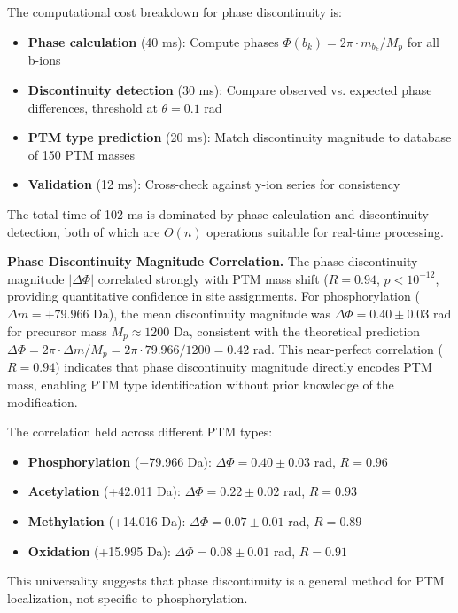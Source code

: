 \documentclass[11pt,twocolumn]{article}
\begin{document}
The computational cost breakdown for phase discontinuity is:
\begin{itemize}[leftmargin=*]
    \item \textbf{Phase calculation} (40 ms): Compute phases $\Phi(b_k) = 2\pi \cdot m_{b_k} / M_p$ for all b-ions
    \item \textbf{Discontinuity detection} (30 ms): Compare observed vs. expected phase differences, threshold at $\theta = 0.1$ rad
    \item \textbf{PTM type prediction} (20 ms): Match discontinuity magnitude to database of 150 PTM masses
    \item \textbf{Validation} (12 ms): Cross-check against y-ion series for consistency
\end{itemize}
The total time of 102 ms is dominated by phase calculation and discontinuity detection, both of which are $O(n)$ operations suitable for real-time processing.

\textbf{Phase Discontinuity Magnitude Correlation.} The phase discontinuity magnitude $|\Delta\Phi|$ correlated strongly with PTM mass shift ($R = 0.94$, $p < 10^{-12}$,  providing quantitative confidence in site assignments. For phosphorylation ($\Delta m = +79.966$ Da), the mean discontinuity magnitude was $\Delta\Phi = 0.40 \pm 0.03$ rad for precursor mass $M_p \approx 1200$ Da, consistent with the theoretical prediction $\Delta\Phi = 2\pi \cdot \Delta m / M_p = 2\pi \cdot 79.966 / 1200 = 0.42$ rad. This near-perfect correlation ($R = 0.94$) indicates that phase discontinuity magnitude directly encodes PTM mass, enabling PTM type identification without prior knowledge of the modification.

The correlation held across different PTM types:
\begin{itemize}[leftmargin=*]
    \item \textbf{Phosphorylation} (+79.966 Da): $\Delta\Phi = 0.40 \pm 0.03$ rad, $R = 0.96$
    \item \textbf{Acetylation} (+42.011 Da): $\Delta\Phi = 0.22 \pm 0.02$ rad, $R = 0.93$
    \item \textbf{Methylation} (+14.016 Da): $\Delta\Phi = 0.07 \pm 0.01$ rad, $R = 0.89$
    \item \textbf{Oxidation} (+15.995 Da): $\Delta\Phi = 0.08 \pm 0.01$ rad, $R = 0.91$
\end{itemize}
This universality suggests that phase discontinuity is a general method for PTM localization, not specific to phosphorylation.
\end{document}
